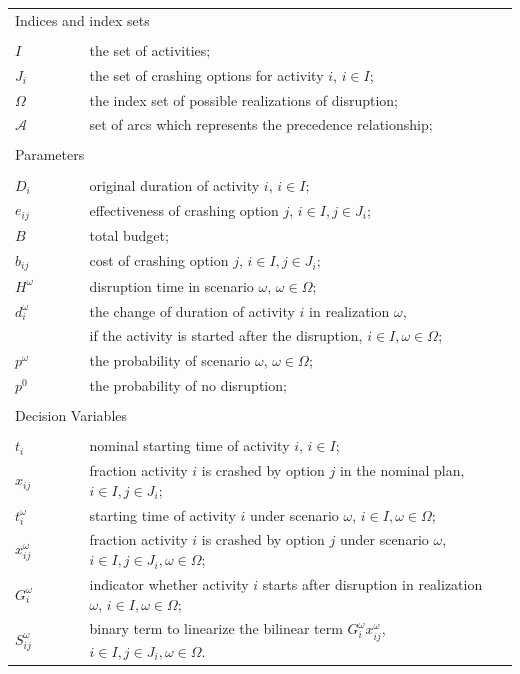 \documentclass[11pt]{article}
\begin{document}
	\begin{longtable}[H]{ l l l l }
		\multicolumn{4}{l}{Indices and index sets} \\
		\\
		\(I\) & \(\qquad\) & the set of activities;&\\
		\(J_i\) & \(\qquad\) & the set of crashing options for activity \(i\), \(i \in I\);&\\
		\(\Omega\) & \(\qquad\) & the index set of possible realizations of disruption;&\\
		\(\mathcal{A}\) &\(\qquad\) & set of arcs which represents the precedence relationship;&\\
		\\
		\multicolumn{4}{l}{Parameters} \\
		\\
		\(D_{i}\)& \(\qquad\) & original duration of activity \(i\), \(i \in I\);&\\
		\(e_{ij}\) & \(\qquad\) & effectiveness of crashing option \(j\), \(i \in I, j \in J_i\);&\\
		\(B\) & \(\qquad\) & total budget;&\\
		\(b_{ij}\) & \(\qquad\) & cost of crashing option \(j\), \(i \in I, j \in J_i\);&\\
		\(H^\omega\) &\(\qquad\) & disruption time in scenario \(\omega\), \(\omega \in \Omega\);&\\
		\(d_{i}^\omega\) & \(\qquad\)&the change of duration of activity \(i\) in realization \(\omega\), &\\
		& \(\qquad\) & if the activity is started after the disruption, \(i \in I, \omega \in \Omega\);& \\
		\(p^\omega\) & \(\qquad\) & the probability of scenario \(\omega\), \(\omega \in \Omega\);& \\
		\(p^0\) & \(\qquad\) & the probability of no disruption;& \\
		\\
		\multicolumn{4}{l}{Decision Variables}\\
		\\
		\(t_{i}\) & \(\qquad\) & nominal starting time of activity \(i\), \(i \in I\);&\\
		\(x_{ij}\) & \(\qquad\) & fraction activity \(i\) is crashed by option \(j\) in the nominal plan, \(i \in I, j \in J_i\); &\\
		\(t_{i}^\omega\) & \(\qquad\) & starting time of activity \(i\) under scenario \(\omega\), \(i \in I, \omega \in \Omega\);&\\
		\(x_{ij}^\omega\) & \(\qquad\) & fraction activity \(i\) is crashed by option \(j\) under scenario \(\omega\), \(i \in I, j \in J_i, \omega \in \Omega \); &\\
		\(G_i^\omega\) & \(\qquad\) & indicator whether activity \(i\) starts after disruption in realization \(\omega\), \(i \in I, \omega \in \Omega\);&\\
		\(S_{ij}^\omega\) & \(\qquad\) & binary term to linearize the bilinear term \(G_i^\omega x_{ij}^\omega\), \(i \in I, j \in J_{i}, \omega \in \Omega\).&\\
	\end{longtable}
\end{document}
